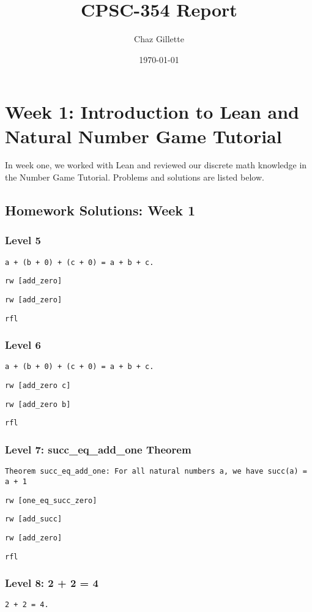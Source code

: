 \documentclass{article}
\title{CPSC-354 Report}
\author{Chaz Gillette}
\date{\today}
\begin{document}
\maketitle
\tableofcontents
\newpage


\section{Week 1: Introduction to Lean and Natural Number Game Tutorial}
\label{sec:week1}

In week one, we worked with Lean and reviewed our discrete math knowledge in the Number Game Tutorial. Problems and solutions are listed below.

\subsection*{Homework Solutions: Week 1}

\subsubsection*{Level 5}
\texttt{a + (b + 0) + (c + 0) = a + b + c.}

\texttt{rw [add\_zero]}

\texttt{rw [add\_zero]}

\texttt{rfl}

\subsubsection*{Level 6}
\texttt{a + (b + 0) + (c + 0) = a + b + c.}

\texttt{rw [add\_zero c]}

\texttt{rw [add\_zero b]}

\texttt{rfl}

\subsubsection*{Level 7: succ\_eq\_add\_one Theorem}
\texttt{Theorem succ\_eq\_add\_one: For all natural numbers a, we have succ(a) = a + 1}

\texttt{rw [one\_eq\_succ\_zero]}

\texttt{rw [add\_succ]}

\texttt{rw [add\_zero]}

\texttt{rfl}

\subsubsection*{Level 8: 2 + 2 = 4}
\texttt{2 + 2 = 4.}
\end{document}
